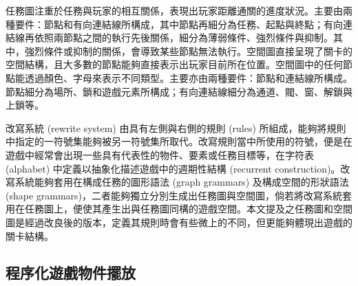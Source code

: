 任務圖注重於任務與玩家的相互關係，表現出玩家距離通關的進度狀況。主要由兩種要件：節點和有向連結線所構成，其中節點再細分為任務、起點與終點；有向連結線再依照兩節點之間的執行先後關係，細分為薄弱條件、強烈條件與抑制。其中，強烈條件或抑制的關係，會導致某些節點無法執行。空間圖直接呈現了關卡的空間結構，且大多數的節點能夠直接表示出玩家目前所在位置。空間圖中的任何節點能透過顏色、字母來表示不同類型。主要亦由兩種要件：節點和連結線所構成。節點細分為場所、鎖和遊戲元素所構成；有向連結線細分為通道、閥、窗、解鎖與上鎖等。

改寫系統 (rewrite system) 由具有左側與右側的規則 (rules) 所組成，能夠將規則中指定的一符號集能夠被另一符號集所取代。改寫規則當中所使用的符號，便是在遊戲中經常會出現一些具有代表性的物件、要素或任務目標等，在字符表 (alphabet) 中定義以抽象化描述遊戲中的週期性結構 (recurrent construction)。改寫系統能夠套用在構成任務的圖形語法 (graph grammars) 及構成空間的形狀語法 (shape grammars)，二者能夠獨立分別生成出任務圖與空間圖，倘若將改寫系統套用在任務圖上，便使其產生出與任務圖同構的遊戲空間。本文提及之任務圖和空間圖是經過改良後的版本，定義其規則時會有些微上的不同，但更能夠體現出遊戲的關卡結構。





\subsection{程序化遊戲物件擺放}
\label{ssec:relatedworks-proceduralgamepatterns}

